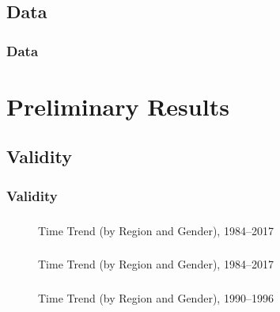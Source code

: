 \documentclass[11pt, aspectratio=1610, xcolor={dvipsnames}]{beamer}
\begin{document}
	\subsection{Data}
	\begin{frame}
		\frametitle{Data}
	\end{frame}
	
	\section{Preliminary Results}
	\begin{frame}
		\frametitle{}
	\end{frame}
	
	\subsection{Validity}
	\begin{frame}
		\frametitle{Validity}
	\end{frame}
	
	\begin{frame}
		\frametitle{}
		
		\begin{figure}[h]
			\centering
			\caption{Time Trend (by Region and Gender), 1984--2017}
			\label{fig:trend}
			\resizebox{75mm}{!}{}
		\end{figure}
		
	\end{frame}
	
	\begin{frame}
		\frametitle{}
		
		\begin{figure}[h]
			\centering
			\caption{Time Trend (by Region and Gender), 1984--2017}
			\label{fig:trend_highlight}
			\resizebox{75mm}{!}{}
		\end{figure}
		
	\end{frame}
	
	\begin{frame}
		\frametitle{}
		
		\begin{figure}[h]
			\centering
			\caption{Time Trend (by Region and Gender), 1990--1996}
			\label{fig:trend_zoomed}
			\resizebox{75mm}{!}{}
		\end{figure}
		
	\end{frame}
	
\end{document}
